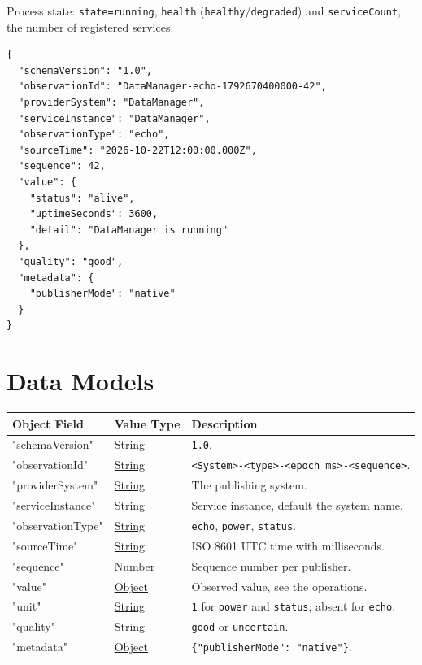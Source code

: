 \documentclass[a4paper]{arrowhead}
\newcommand{\oref}[1]{{\textcolor{ArrowheadBlue}{\hyperref[sec:operations:#1]{#1}}}}
\newcommand{\pref}[1]{{\textcolor{ArrowheadGrey}{\hyperref[sec:model:primitives:#1]{#1}}}}
\begin{document}
Process state: \texttt{state=\allowbreak{}running}, \texttt{health} (\texttt{healthy}/\texttt{degraded}) and \texttt{serviceCount}, the number of registered services.

\begin{lstlisting}[caption={An \oref{echo} observation.}]
{
  "schemaVersion": "1.0",
  "observationId": "DataManager-echo-1792670400000-42",
  "providerSystem": "DataManager",
  "serviceInstance": "DataManager",
  "observationType": "echo",
  "sourceTime": "2026-10-22T12:00:00.000Z",
  "sequence": 42,
  "value": {
    "status": "alive",
    "uptimeSeconds": 3600,
    "detail": "DataManager is running"
  },
  "quality": "good",
  "metadata": {
    "publisherMode": "native"
  }
}
\end{lstlisting}

\newpage

\section{Data Models}
\label{sec:model}


\noindent\begin{tabularx}{\textwidth}{| p{4.25cm} | p{3.5cm} | X |} \hline
\rowcolor{gray!33} Object Field & Value Type & Description \\ \hline
"schemaVersion" & \pref{String} & \texttt{1.0}. \\ \hline
"observationId" & \pref{String} & \texttt{<System>-<type>-<epoch ms>-<sequence>}. \\ \hline
"providerSystem" & \pref{String} & The publishing system. \\ \hline
"serviceInstance" & \pref{String} & Service instance, default the system name. \\ \hline
"observationType" & \pref{String} & \texttt{echo}, \texttt{power}, \texttt{status}. \\ \hline
"sourceTime" & \pref{String} & ISO 8601 UTC time with milliseconds. \\ \hline
"sequence" & \pref{Number} & Sequence number per publisher. \\ \hline
"value" & \pref{Object} & Observed value, see the operations. \\ \hline
"unit" & \pref{String} & \texttt{1} for \texttt{power} and \texttt{status}; absent for \texttt{echo}. \\ \hline
"quality" & \pref{String} & \texttt{good} or \texttt{uncertain}. \\ \hline
"metadata" & \pref{Object} & \texttt{\{"publisherMode": "native"\}}. \\ \hline
\end{tabularx}
\end{document}
